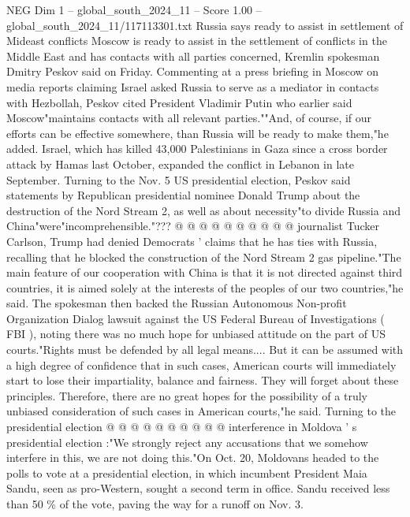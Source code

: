 \begin{textsample}{NEG Dim 1 – global\_south\_2024\_11 – Score 1.00 – global\_south\_2024\_11/117113301.txt}  \label{ex:f1_neg_280}
Russia says ready to assist in settlement of Mideast conflicts Moscow is ready to assist in the settlement of conflicts in the Middle East and has contacts with all parties concerned, Kremlin spokesman Dmitry Peskov said on Friday.
Commenting at a press briefing in Moscow on media reports claiming Israel asked Russia to serve as a mediator in contacts with Hezbollah, Peskov cited President Vladimir Putin who earlier said Moscow"maintains contacts with all relevant parties.""And, of course, if our efforts can be effective somewhere, than Russia will be ready to make them,"he added.
Israel, which has killed 43,000 Palestinians in Gaza since a cross border attack by Hamas last October, expanded the conflict in Lebanon in late September.
Turning to the Nov. 5 US presidential election, Peskov said statements by Republican presidential nominee Donald Trump about the destruction of the Nord Stream 2, as well as about necessity"to divide Russia and China"were"incomprehensible."??? @ @ @ @ @ @ @ @ @ @ journalist Tucker Carlson, Trump had denied Democrats ' claims that he has ties with Russia, recalling that he blocked the construction of the Nord Stream 2 gas pipeline."The main feature of our cooperation with China is that it is not directed against third countries, it is aimed solely at the interests of the peoples of our two countries,"he said.
The spokesman then backed the Russian Autonomous Non-profit Organization Dialog lawsuit against the US Federal Bureau of Investigations ( FBI ), noting there was no much hope for unbiased attitude on the part of US courts."Rights must be defended by all legal means....
But it can be assumed with a high degree of confidence that in such cases, American courts will immediately start to lose their impartiality, balance and fairness.
They will forget about these principles.
Therefore, there are no great hopes for the possibility of a truly unbiased consideration of such cases in American courts,"he said.
Turning to the presidential election @ @ @ @ @ @ @ @ @ @ interference in Moldova ' s presidential election :"We strongly reject any accusations that we somehow interfere in this, we are not doing this."On Oct. 20, Moldovans headed to the polls to vote at a presidential election, in which incumbent President Maia Sandu, seen as pro-Western, sought a second term in office.
Sandu received less than 50 \% of the vote, paving the way for a runoff on Nov. 3.

\end{textsample}
